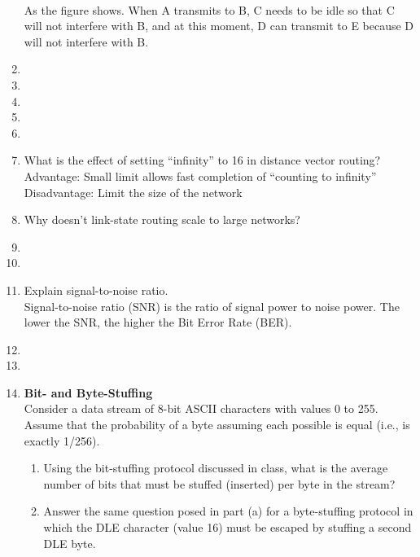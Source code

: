 \documentclass[10pt, a4paper]{article}
\begin{document}
\begin{enumerate}
\\
    As the figure shows. When A transmits to B, C needs to be idle so that C will not interfere with B, and at this moment, D can transmit to E because D will not interfere with B.
    \color{black}
\item\mbox{}
\item\mbox{}
\item\mbox{}
\item\mbox{}
\item\mbox{}
\item\mbox{}What is the effect of setting ``infinity'' to 16 in distance vector routing?\\
    \color{blue}
    Advantage: Small limit allows fast completion of ``counting to infinity''\\
    Disadvantage: Limit the size of the network
    \color{black}
\item\mbox{}Why doesn't link-state routing scale to large networks?\\
    \color{blue}
    \color{black}
\item\mbox{}
\item\mbox{}
\item\mbox{} Explain signal-to-noise ratio.\\
    \color{blue}
    Signal-to-noise ratio (SNR) is the ratio of signal power to noise power. The lower the SNR, the higher the Bit Error Rate (BER).
    \color{black}
\item\mbox{}
\item\mbox{}
\item\mbox{}\textbf{Bit- and Byte-Stuffing}\\
    Consider a data stream of 8-bit ASCII characters with values 0 to 255. Assume that the probability of a byte assuming each possible is equal (i.e., is exactly 1/256).
    \begin{enumerate}
    \item Using the bit-stuffing protocol discussed in class, what is the average number of bits that must be stuffed (inserted) per byte in the stream?\\
    \item Answer the same question posed in part (a) for a byte-stuffing protocol in which the DLE character (value 16) must be escaped by stuffing a second DLE byte.\\

\end{enumerate}
\end{enumerate}
\end{document}
